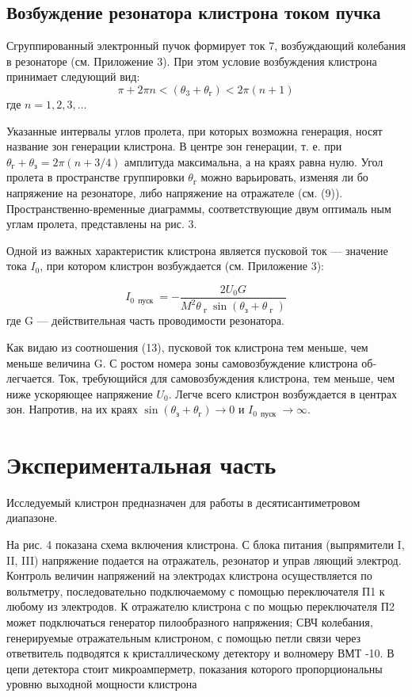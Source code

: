 \subsection{Возбуждение резонатора клистрона током пучка}
Сгруппированный электронный пучок формирует ток 7, возбуждающий
колебания в резонаторе (см. Приложение 3). При этом условие возбуждения
клистрона принимает следующий вид:
\begin{equation}
	\pi + 2 \pi n < \left( \theta _ { 3 } + \theta _ { \text{г} } \right) < 2 \pi ( n + 1 )
\end{equation}где $n=1,2,3,\dots $

Указанные интервалы углов пролета, при которых возможна генерация,
носят название зон генерации клистрона. В центре зон генерации, т. е. при
$\theta _ { \text{г} } + \theta _ { \text{з} } = 2 \pi ( n + 3 / 4 )$ амплитуда максимальна, а на краях равна нулю. Угол
пролета в пространстве группировки $\theta _ { \text{г} }$ можно варьировать, изменяя ли­
бо напряжение на резонаторе, либо напряжение на отражателе (см. (9)).
Пространственно-временные диаграммы, соответствующие двум оптималь­
ным углам пролета, представлены на рис. 3.

Одной из важных характеристик клистрона является пусковой ток — зна­чение тока $I_0$, при котором клистрон возбуждается (см. Приложение 3):

\begin{equation}
	I _ { 0 \, \text { пуск } } = - \frac { 2 U _ { 0 } G } { M ^ { 2 } 
	\theta _ { \text{ г } } \sin \left( \theta _ { \text{з} } + \theta _ { \text{ г } } \right) }
\end{equation} где G — действительная часть проводимости резонатора.

Как видаю из соотношения (13), пусковой ток клистрона тем меньше, чем
меньше величина G. С ростом номера зоны самовозбуждение клистрона об­легчается. Ток, требующийся для самовозбуждения клистрона, тем меньше,
чем ниже ускоряющее напряжение $U_0$. Легче всего клистрон возбуждается
в центрах зон. Напротив, на их краях 
$\sin \left( \theta _ { \text{з} } + \theta _ { \text{г} } \right) \rightarrow 0$ и 
$I _ { 0\, \text { пуск } } \rightarrow \infty$.
\section{Экспериментальная часть}

Исследуемый клистрон предназначен для работы в десятисантиметровом
диапазоне.

На рис. 4 показана схема включения клистрона. С блока питания (выпря­мители I, II, III) напряжение подается на отражатель, резонатор и управ­
ляющий электрод. Контроль величин напряжений на электродах клистрона
осуществляется по вольтметру, последовательно подключаемому с помощью
переключателя П1 к любому из электродов. К отражателю клистрона с по­
мощью переключателя П2 может подключаться генератор пилообразного
напряжения; СВЧ колебания, генерируемые отражательным клистроном, с
помощью петли связи через ответвитель подводятся к кристаллическому
детектору и волномеру ВМТ -10. В цепи детектора стоит микроамперметр,
показания которого пропорциональны уровню выходной мощности клистро­на

